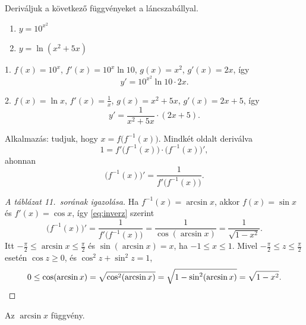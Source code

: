 \documentclass[11pt]{article}
\begin{document}
\begin{exbox}
\begin{example}
Deriváljuk a következő függvényeket a láncszabállyal.
\begin{enumerate}[label=\arabic*., itemsep=2pt]
\item $y=10^{x^{2}}$
\item $y=\ln(x^{2}+5x)$
\end{enumerate}
\end{example}
\end{exbox}
\begin{solution}
1. $f(x)=10^{x}$, $f'(x)=10^{x}\ln 10$, $g(x)=x^{2}$, $g'(x)=2x$, így
\[
y'=10^{x^{2}}\ln 10\cdot 2x .
\]

2. $f(x)=\ln x$, $f'(x)=\frac{1}{x}$, $g(x)=x^{2}+5x$, $g'(x)=2x+5$, így
\[
y'=\frac{1}{x^{2}+5x}\cdot(2x+5).
\]
\end{solution}

\noindent Alkalmazás: tudjuk, hogy $x=f\bigl(f^{-1}(x)\bigr)$. Mindkét oldalt deriválva
\[
1=f'\bigl(f^{-1}(x)\bigr)\cdot\bigl(f^{-1}(x)\bigr)',
\]
ahonnan
\begin{equation}\label{eq:inverz}
\bigl(f^{-1}(x)\bigr)'=\frac{1}{f'\bigl(f^{-1}(x)\bigr)}.
\end{equation}

\begin{proof}[A táblázat 11.\ sorának igazolása]
Ha $f^{-1}(x)=\arcsin x$, akkor $f(x)=\sin x$ és $f'(x)=\cos x$, így \eqref{eq:inverz} szerint
\[
\bigl(f^{-1}(x)\bigr)'=\frac{1}{f'\bigl(f^{-1}(x)\bigr)}=\frac{1}{\cos(\arcsin x)}=\frac{1}{\sqrt{1-x^{2}}}.
\]
Itt $-\frac{\pi}{2}\le\arcsin x\le\frac{\pi}{2}$ és $\sin(\arcsin x)=x$, ha $-1\le x\le 1$. Mivel $-\frac{\pi}{2}\le z\le\frac{\pi}{2}$ esetén $\cos z\ge 0$, és $\cos^{2}z+\sin^{2}z=1$,
\[
0\le\cos(\arcsin x)=\sqrt{\cos^{2}(\arcsin x)}=\sqrt{1-\sin^{2}(\arcsin x)}=\sqrt{1-x^{2}} . \qedhere
\]
\end{proof}

\begin{notefig}{Az $\arcsin x$ függvény.}
\end{notefig}
\end{document}
